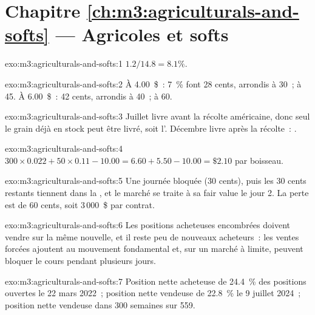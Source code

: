\section*{Chapitre \ref{ch:m3:agriculturals-and-softs} --- Agricoles et softs}

\begin{solution}{exo:m3:agriculturals-and-softs:1}
$1.2/14.8 = 8.1\%$.
\end{solution}

\begin{solution}{exo:m3:agriculturals-and-softs:2}
À 4.00~\$~: 7~\% font 28 cents, arrondis à 30~;  à 45. À 6.00~\$~: 42 cents, arrondis à 40~;  à 60.
\end{solution}

\begin{solution}{exo:m3:agriculturals-and-softs:3}
Juillet livre avant la récolte américaine, donc seul le grain déjà en stock peut être livré, soit l'. Décembre
livre après la récolte~: .
\end{solution}

\begin{solution}{exo:m3:agriculturals-and-softs:4}
$300 \times 0.022 + 50 \times 0.11 - 10.00 = 6.60 + 5.50 - 10.00 = \$2.10$ par boisseau.
\end{solution}

\begin{solution}{exo:m3:agriculturals-and-softs:5}
Une journée bloquée (30 cents), puis les 30 cents restants tiennent dans la , et le marché
se traite à sa fair value le jour 2. La perte est de 60 cents, soit 3\,000~\$ par contrat.
\end{solution}

\begin{solution}{exo:m3:agriculturals-and-softs:6}
Les positions acheteuses encombrées doivent vendre sur la même nouvelle, et il reste peu de nouveaux acheteurs~: les ventes forcées ajoutent au
mouvement fondamental et, sur un marché à limite, peuvent bloquer le cours pendant plusieurs jours.
\end{solution}

\begin{solution}{exo:m3:agriculturals-and-softs:7}
Position nette acheteuse de 24.4~\% des positions ouvertes le 22 mars 2022~; position nette vendeuse de 22.8~\% le 9 juillet 2024~;
position nette vendeuse dans 300 semaines sur 559.
\end{solution}

